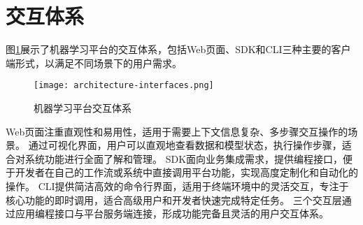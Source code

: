 \section{交互体系}

图\ref{fig:architecture-interfaces}展示了机器学习平台的交互体系，包括Web页面、SDK和CLI三种主要的客户端形式，以满足不同场景下的用户需求。

\begin{figure}
  \centering
  \texttt{[image: architecture-interfaces.png]}
  \caption{机器学习平台交互体系}
  \label{fig:architecture-interfaces}
\end{figure}

Web页面注重直观性和易用性，适用于需要上下文信息复杂、多步骤交互操作的场景。
通过可视化界面，用户可以直观地查看数据和模型状态，执行操作步骤，适合对系统功能进行全面了解和管理。
SDK面向业务集成需求，提供编程接口，便于开发者在自己的工作流或系统中直接调用平台功能，实现高度定制化和自动化的操作。
CLI提供简洁高效的命令行界面，适用于终端环境中的灵活交互，专注于核心功能的即时调用，适合高级用户和开发者快速完成特定任务。
三个交互层通过应用编程接口与平台服务端连接，形成功能完备且灵活的用户交互体系。
